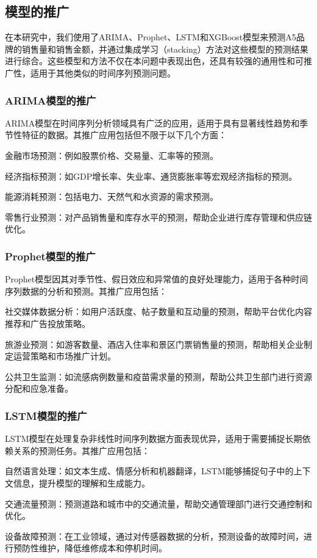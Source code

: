 \documentclass[a4paper]{article}
\begin{document}
	\subsection{模型的推广}
	在本研究中，我们使用了ARIMA、Prophet、LSTM和XGBoost模型来预测A5品牌的销售量和销售金额，并通过集成学习（stacking）方法对这些模型的预测结果进行综合。这些模型和方法不仅在本问题中表现出色，还具有较强的通用性和可推广性，适用于其他类似的时间序列预测问题。

	\subsubsection{ARIMA模型的推广}
	ARIMA模型在时间序列分析领域具有广泛的应用，适用于具有显著线性趋势和季节性特征的数据。其推广应用包括但不限于以下几个方面：

	金融市场预测：例如股票价格、交易量、汇率等的预测。

	经济指标预测：如GDP增长率、失业率、通货膨胀率等宏观经济指标的预测。

	能源消耗预测：包括电力、天然气和水资源的需求预测。

	零售行业预测：对产品销售量和库存水平的预测，帮助企业进行库存管理和供应链优化。

	\subsubsection{Prophet模型的推广}
	Prophet模型因其对季节性、假日效应和异常值的良好处理能力，适用于各种时间序列数据的分析和预测。其推广应用包括：

	社交媒体数据分析：如用户活跃度、帖子数量和互动量的预测，帮助平台优化内容推荐和广告投放策略。
	
	旅游业预测：如游客数量、酒店入住率和景区门票销售量的预测，帮助相关企业制定运营策略和市场推广计划。
	
	公共卫生监测：如流感病例数量和疫苗需求量的预测，帮助公共卫生部门进行资源分配和应急准备。
	\subsubsection{LSTM模型的推广}
	LSTM模型在处理复杂非线性时间序列数据方面表现优异，适用于需要捕捉长期依赖关系的预测任务。其推广应用包括：

	自然语言处理：如文本生成、情感分析和机器翻译，LSTM能够捕捉句子中的上下文信息，提升模型的理解和生成能力。
	
	交通流量预测：预测道路和城市中的交通流量，帮助交通管理部门进行交通控制和优化。
	
	设备故障预测：在工业领域，通过对传感器数据的分析，预测设备的故障时间，进行预防性维护，降低维修成本和停机时间。
\end{document}
